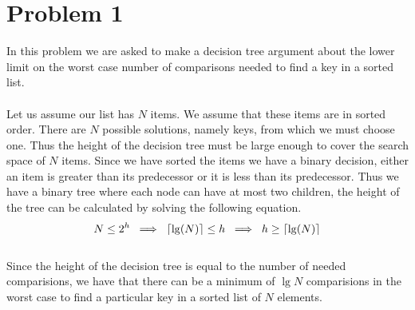 \section*{Problem 1}

In this problem we are asked to make a decision tree argument about the
lower limit on the worst case number of comparisons needed to find a
key in a sorted list.
\\
\\
Let us assume our list has $N$ items. We assume that these items are in
sorted order. There are $N$ possible solutions, namely keys, from which 
we must choose one. Thus the height of the decision tree must be large
enough to cover the search space of $N$ items. Since we have sorted the 
items we have a binary decision, either an item is greater than its 
predecessor or it is less than its predecessor. Thus we have a binary 
tree where each node can have at most two children, the height of the 
tree can be calculated by solving the following equation.
\\
$$
    N \leq 2^h \; \implies \; 
    \lceil\lg (N)\rceil \leq h \; \implies \; 
    h \geq \lceil\lg (N)\rceil
$$
\\
Since the height of the decision tree is equal to the number of needed
comparisions, we have that there can be a minimum of $\lg N$
comparisions in the worst case to find a particular key in a sorted
list of $N$ elements.